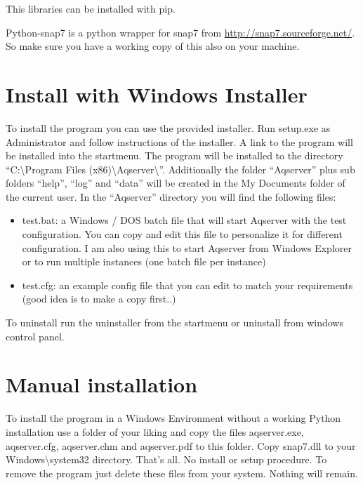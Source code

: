 \documentclass[a4paper,10pt,english]{sphinxmanual}
\begin{document}
This libraries can be installed with pip.

Python-snap7 is a python wrapper for snap7 from \href{http://snap7.sourceforge.net/}{http://snap7.sourceforge.net/}. So make sure you have a working copy of this also on your machine.


\section{Install with Windows Installer}
\label{installation:install-with-windows-installer}
To install the program you can use the provided installer. Run setup.exe as Administrator and follow instructions of the installer. A link to the program will be installed into the startmenu.
The program will be installed to the directory ``C:\textbackslash{}Program Files (x86)\textbackslash{}Aqserver\textbackslash{}''. Additionally the folder ``Aqserver'' plus sub folders ``help'', ``log'' and ``data'' will be created in the My Documents folder of the current user.
In the ``Aqserver'' directory you will find the following files:
\begin{itemize}
\item {} 
test.bat: a Windows / DOS batch file that will start Aqserver with the test configuration. You can copy and edit this file to personalize it for different configuration. I am also using this to start Aqserver from Windows Explorer or to run multiple instances (one batch file per instance)

\item {} 
test.cfg: an example config file that you can edit to match your requirements (good idea is to make a copy first..)

\end{itemize}

To uninstall run the uninstaller from the startmenu or uninstall from windows control panel.


\section{Manual installation}
\label{installation:manual-installation}
To install the program in a Windows Environment without a working Python installation use a folder of your liking and copy the files aqserver.exe, aqserver.cfg, aqserver.chm and aqserver.pdf to this folder. Copy snap7.dll to your Windows\textbackslash{}system32 directory. That's all. No install or setup procedure.
To remove the program just delete these files from your system. Nothing will remain.
\end{document}
